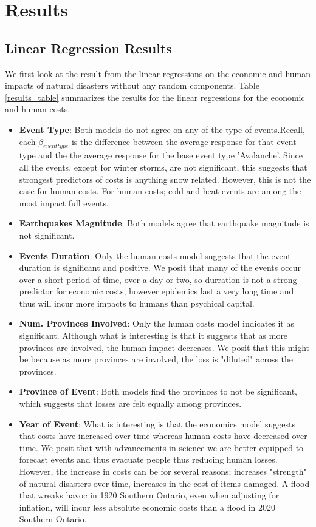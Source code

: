 \section{Results}
\subsection{Linear Regression Results}
We first look at the result from the linear regressions on the economic and human impacts of natural disasters without any random components. Table \ref{results_table} summarizes the results for the linear regressions for the economic and human costs.




\begin{itemize}
	\item \textbf{Event Type}: Both models do not agree on any of the type of events.Recall, each $\beta_{event type}$ is the difference between the average response for that event type and the the average response for the base event type 'Avalanche'. Since all the events, except for winter storms, are not significant, this suggests that strongest predictors of costs is anything snow related. However, this is not the case for human costs. For human costs; cold and heat events are among the most impact full events.
	\item \textbf{Earthquakes Magnitude}: Both models agree that earthquake magnitude is not significant.
	\item \textbf{Events Duration}: Only the human costs model suggests that the event duration is significant and positive. We posit that many of the events occur over a short period of time, over a day or two, so durration is not a strong predictor for economic costs, however epidemics last a very long time and thus will incur more impacts to humans than psychical capital.
	\item \textbf{Num. Provinces Involved}: Only the human costs model indicates it as significant. Although what is interesting is that it suggests that as more provinces are involved, the human impact decreases. We posit that this might be because as more provinces are involved, the loss is "diluted" across the provinces.
	\item \textbf{Province of Event}: Both models find the provinces to not be significant, which suggests that losses are felt equally among provinces.
	\item \textbf{Year of Event}: What is interesting is that the economics model suggests that costs have increased over time whereas human costs have decreased over time. We posit that with advancements in science we are better equipped to forecast events and thus evacuate people thus reducing human losses. However, the increase in costs can be for several reasons; increases "strength" of natural disasters over time, increases in the cost of items damaged. A flood that wreaks havoc in 1920 Southern Ontario, even when adjusting for inflation, will incur less absolute economic costs than a flood in 2020 Southern Ontario.

\end{itemize}
